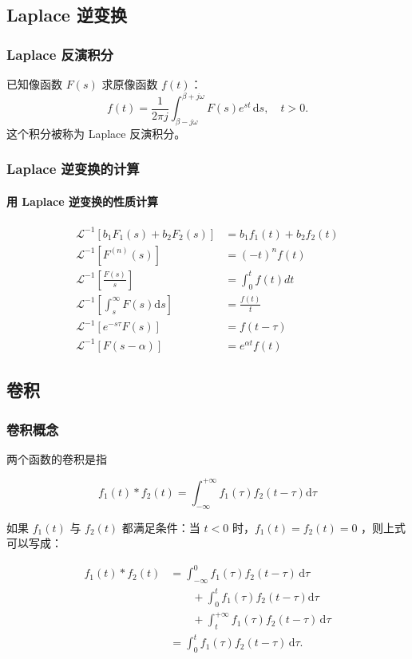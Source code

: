 \subsection{Laplace 逆变换}
\label{laplace-逆变换}
\subsubsection{Laplace 反演积分}
\label{laplace-反演积分}
已知像函数 \(F(s)\) 求原像函数 \(f(t)\)： \[
f(t)=\frac{1}{2\pi j} \int _{\beta - j\omega}^{\beta + j\omega} F(s)e^{st}\,\mathrm{d}s,\quad t > 0.
\] 这个积分被称为 Laplace 反演积分。
\subsubsection{Laplace 逆变换的计算}
\label{laplace-逆变换的计算}
\paragraph{用 Laplace 逆变换的性质计算}
\label{用-laplace-逆变换的性质计算}
\begin{align*}
\mathcal{L}^{-1}\left[b_{1} F_{1}(s)+b_{2} F_{2}(s)\right] &= b_{1} f_{1}(t)+b_{2} f_{2}(t) \\
\mathcal{L}^{-1}\left[F^{(n)}(s)\right] &= (-t)^{n} f(t) \\
\mathcal{L}^{-1}\left[\frac{F(s)}{s}\right] &= \int_{0}^{t} f(t)dt \\
\mathcal{L}^{-1}\left[\int_{s}^{\infty} F(s)\mathrm{d} s\right] &= \frac{f(t)}{t} \\
\mathcal{L}^{-1}\left[e^{-s\tau} F(s)\right] &= f(t-\tau) \\
\mathcal{L}^{-1}\left[F(s-\alpha)\right] &= e^{\alpha t}f(t)
\end{align*}
\subsection{卷积}
\label{卷积}
\subsubsection{卷积概念}
\label{卷积概念}
两个函数的卷积是指

\[
f_{1}(t) * f_{2}(t) = \int_{-\infty}^{+\infty} f_{1}(\tau) f_{2}(t-\tau)  \mathrm{d} \tau
\]

如果 \(f_{1}(t)\) 与 \(f_{2}(t)\) 都满足条件：当 \(t < 0\) 时，\(f_{1}(t) = f_{2}(t) = 0\) ，则上式可以写成：

\begin{align*}
f_{1}(t) * f_{2}(t) &= \int_{-\infty}^{0} f_{1}(\tau) f_{2}(t-\tau) \,\mathrm{d} \tau
\\
&\qquad +\int_{0}^{t} f_{1}(\tau) f_{2}(t-\tau)  \mathrm{d} \tau
\\
&\qquad + \int_{t}^{+\infty} f_{1}(\tau) f_{2}(t-\tau) \,\mathrm{d} \tau
\\
&= \int_{0}^{t} f_{1}(\tau) f_{2}(t-\tau) \,\mathrm{d} \tau .
\end{align*}
